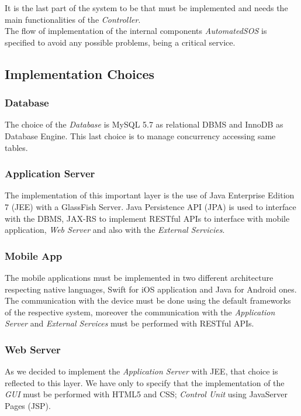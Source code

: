 \myparagraph{}
It is the last part of the system to be that must be implemented and needs the main functionalities of the \textit{Controller}.\\
The flow of implementation of the internal components \textit{AutomatedSOS} is specified to avoid any possible problems, being a critical service.

\subsection{Implementation Choices}

\subsubsection{Database}
The choice of the \textit{Database} is MySQL 5.7 as relational DBMS and InnoDB as Database Engine. This last choice is to manage concurrency accessing same tables.

\subsubsection{Application Server}
The implementation of this important layer is the use of Java Enterprise Edition 7 (JEE) with a GlassFish Server. Java Persistence API (JPA) is used to interface with the DBMS, JAX-RS to implement RESTful APIs to interface with mobile application, \textit{Web Server} and also with the \textit{External Servicies}.

\subsubsection{Mobile App}
The mobile applications must be implemented in two different architecture respecting native languages, Swift for iOS application and Java for Android ones. The communication with the device must be done using the default frameworks of the respective system, moreover the communication with the \textit{Application Server} and \textit{External Services} must be performed with RESTful APIs.

\subsubsection{Web Server}
As we decided to implement the \textit{Application Server} with JEE, that choice is reflected to this layer. We have only to specify that the implementation of the \textit{GUI} must be performed with HTML5 and CSS; \textit{Control Unit} using JavaServer Pages (JSP).

